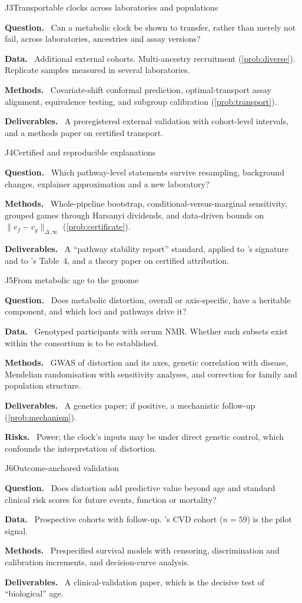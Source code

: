 \documentclass[11pt,a4paper]{article}
\newcommand{\field}[1]{\par\noindent\textbf{\color{navy}#1.}\ }
\theoremstyle{plain}
\theoremstyle{definition}
\theoremstyle{remark}
\begin{document}
\begin{projectcard}{J3}{Transportable clocks across laboratories and populations}
\label{card:J3}
\field{Question} Can a metabolic clock be shown to transfer, rather than merely not fail, across laboratories, ancestries and assay versions?
\field{Data} Additional external cohorts. Multi-ancestry recruitment (\cref{prob:diverse}). Replicate samples measured in several laboratories.
\field{Methods} Covariate-shift conformal prediction, optimal-transport assay alignment, equivalence testing, and subgroup calibration (\cref{prob:transport}).
\field{Deliverables} A preregistered external validation with cohort-level intervals, and a methods paper on certified transport.
\end{projectcard}

\begin{projectcard}{J4}{Certified and reproducible explanations}
\label{card:J4}
\field{Question} Which pathway-level statements survive resampling, background changes, explainer approximation and a new laboratory?
\field{Methods} Whole-pipeline bootstrap, conditional-versus-marginal sensitivity, grouped games through Harsanyi dividends, and data-driven bounds on $\|v_f-v_g\|_{\Delta,\infty}$ (\cref{prob:certificate}).
\field{Deliverables} A ``pathway stability report'' standard, applied to \PI's signature and to \PII's Table~4, and a theory paper on certified attribution.
\end{projectcard}

\begin{projectcard}{J5}{From metabolic age to the genome}
\label{card:J5}
\field{Question} Does metabolic distortion, overall or axis-specific, have a heritable component, and which loci and pathways drive it?
\field{Data} Genotyped participants with serum NMR. Whether such subsets exist within the consortium is to be established.
\field{Methods} GWAS of distortion and its axes, genetic correlation with disease, Mendelian randomisation with sensitivity analyses, and correction for family and population structure.
\field{Deliverables} A genetics paper; if positive, a mechanistic follow-up (\cref{prob:mechanism}).
\field{Risks} Power; the clock's inputs may be under direct genetic control, which confounds the interpretation of distortion.
\end{projectcard}

\begin{projectcard}{J6}{Outcome-anchored validation}
\label{card:J6}
\field{Question} Does distortion add predictive value beyond age and standard clinical risk scores for future events, function or mortality?
\field{Data} Prospective cohorts with follow-up. \PI's CVD cohort ($n=59$) is the pilot signal.
\field{Methods} Prespecified survival models with censoring, discrimination and calibration increments, and decision-curve analysis.
\field{Deliverables} A clinical-validation paper, which is the decisive test of ``biological'' age.
\end{projectcard}
\end{document}
